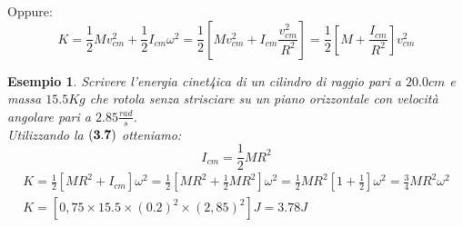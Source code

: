 \documentclass{book}
\newtheorem{esempio}{Esempio}
\begin{document}
Oppure:
\begin{equation}
  K=\frac{1}{2} Mv_{cm}^2+\frac{1}{2}I_{cm}\omega^2=\frac{1}{2}\left[Mv_{cm}^2+I_{cm}
    \frac{v^2_{cm}}{R^2}\right]=\frac{1}{2}\left[M+\frac{I_{cm}}{R^2}\right]v_{cm}^2
\end{equation}
\begin{esempio}
  Scrivere l'energia cinet4ica di un cilindro di raggio pari a $20.0cm$ e massa $15.5Kg$
  che rotola senza strisciare su un piano orizzontale con velocità angolare pari a
  $2.85\frac{rad}{s}$.\\
  Utilizzando la $({\bf 3.7})$ otteniamo:
  \begin{equation*}
    I_{cm}=\frac{1}{2}MR^2
  \end{equation*}
  \begin{eqnarray*}
    K=\frac{1}{2}[MR^2+I_{cm}]\omega^2=\frac{1}{2}\left[MR^2+\frac{1}{2}MR^2\right]
    \omega^2=\frac{1}{2}MR^2\left[1+\frac{1}{2}\right]\omega^2=\frac{3}{4}MR^2\omega^2\\
    K=[0,75\times15.5\times(0.2)^2\times(2,85)^2]J=3.78J
  \end{eqnarray*}
\end{esempio}
\end{document}
